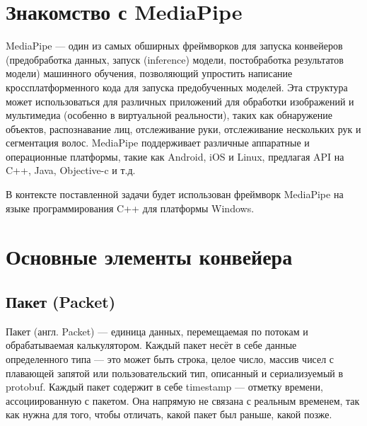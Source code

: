 \documentclass[a4paper,14pt]{extreport}
\begin{document}
        \section{Знакомство с MediaPipe}
        MediaPipe — один из самых обширных фреймворков для запуска конвейеров (предобработка данных, запуск (inference) модели, постобработка результатов модели) машинного обучения, позволяющий упростить написание кроссплатформенного кода для запуска предобученных моделей. Эта структура может использоваться для различных приложений для обработки изображений и мультимедиа (особенно в виртуальной реальности), таких как обнаружение объектов, распознавание лиц, отслеживание руки, отслеживание нескольких рук и сегментация волос. MediaPipe поддерживает различные аппаратные и операционные платформы, такие как Android, iOS и Linux, предлагая API на C++, Java, Objective-c и т.д.

        В контексте поставленной задачи будет использован фреймворк MediaPipe на языке программирования C++ для платформы Windows.
        
        \section{Основные элементы конвейера}
        \subsection{Пакет (Packet)}
        Пакет (англ. Packet) — единица данных, перемещаемая по потокам и обрабатываемая калькулятором. Каждый пакет несёт в себе данные определенного типа — это может быть строка, целое число, массив чисел с плавающей запятой или пользовательский тип, описанный и сериализуемый в protobuf. Каждый пакет содержит в себе timestamp — отметку времени, ассоциированную с пакетом. Она напрямую не связана с реальным временем, так как нужна для того, чтобы отличать, какой пакет был раньше, какой позже. 
        
\end{document}
